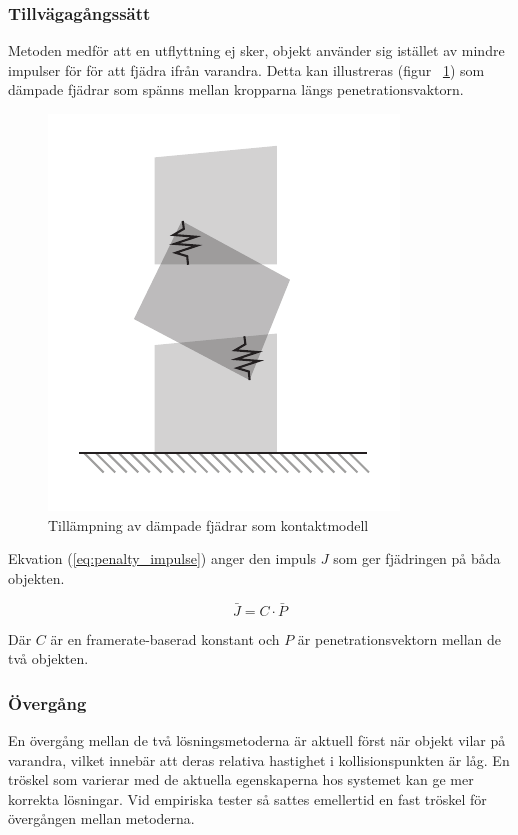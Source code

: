 \documentclass[a4paper,12pt,twopage,swedish]{article}
\begin{document}
\subsubsection{Tillvägagångssätt}
Metoden medför att en utflyttning ej sker, objekt använder sig istället av mindre impulser för för att fjädra ifrån varandra. Detta kan illustreras (figur ~\ref{fig:penalty}) som dämpade fjädrar som spänns mellan kropparna längs penetrationsvaktorn.

\begin{figure}[h!]
	\centering
	\includegraphics{illustrations/penalty.pdf}
	\caption{Tillämpning av dämpade fjädrar som kontaktmodell}
	\label{fig:penalty}
\end{figure}

Ekvation (\ref{eq:penalty_impulse}) anger den impuls $J$ som ger fjädringen på båda objekten.

\begin{equation}\label{eq:penalty_impulse}
\bar{J} = C \cdot \bar{P}
\end{equation}

Där $C$ är en framerate-baserad konstant och $P$ är penetrationsvektorn mellan de två objekten.

\subsubsection{Övergång}
En övergång mellan de två lösningsmetoderna är aktuell först när objekt vilar på varandra, vilket innebär att deras relativa hastighet i kollisionspunkten är låg.
En tröskel som varierar med de aktuella egenskaperna hos systemet kan ge mer korrekta lösningar. Vid empiriska tester så sattes emellertid en fast tröskel för övergången mellan metoderna.
\end{document}
